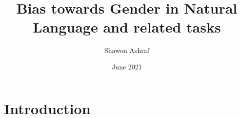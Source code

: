 \documentclass{article}
\title{Bias towards Gender in Natural Language and related tasks}
\author{Shawon Ashraf}
\date{June 2021}
\begin{document}
\maketitle

\section{Introduction}
\end{document}
